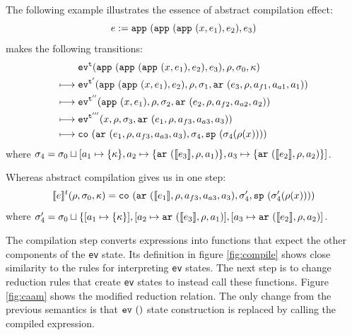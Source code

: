 \documentclass[preprint,onecolumn,9pt]{sigplanconf} %
\begin{document}
The following example illustrates
the essence of abstract compilation effect:
\[
\mexp := \sapp{\sapp{\sapp\mvar{\mexp_1}}{\mexp_2}}{\mexp_3}
\]
makes the following transitions:
\begin{align}
& \ev[^\mcntr]{\sapp{\sapp{\sapp\mvar{\mexp_1}}{\mexp_2}}{\mexp_3},\menv,\msto_0,\mkont}\\
\machstep\; &
\ev[^{\mcntr'}]{\sapp{\sapp\mvar{\mexp_1}}{\mexp_2},\menv,\msto_1,\kar{\mexp_3,\menv,\maddr_{f1},\maddr_{a1},\maddr_1}}
\\
\machstep\; &
\ev[^{\mcntr''}]{\sapp\mvar{\mexp_1},\menv,\msto_2,\kar{\mexp_2,\menv,\maddr_{f2},\maddr_{a2},\maddr_2}}
\\
\machstep\; &
\ev[^{\mcntr'''}]{\mvar, \menv,\msto_3,\kar{\mexp_1,\menv,\maddr_{f3},\maddr_{a3},\maddr_3}} %
\\
\machstep\; &
\spchoice
{\co{\kar{\mexp_1,\menv,\maddr_{f3},\maddr_{a3},\maddr_3},\msto_4,\saddr{\menv(\mvar)}}}
{\co{\kar{\mexp_1,\menv,\maddr_{f3},\maddr_{a3},\maddr_3},\msto_4,\superposition{\msto_4(\menv(\mvar))}}}
\end{align}
where \(
\msto_4 = \msto_0 \sqcup [\maddr_1 \mapsto \setof{\mkont},
\maddr_2 \mapsto \setof{\kar{\compile{\mexp_3},\menv,\maddr_1}},
\maddr_3 \mapsto \setof{\kar{\compile{\mexp_2},\menv,\maddr_2}}]\).

Whereas abstract compilation gives us in one step:
\begin{align*}
\compile{\mexp}^\mcntr(\menv,\msto_0,\mkont) = 
\spchoice
{\co{\kar{\compile{\mexp_1},\menv,\maddr_{f3},\maddr_{a3},\maddr_3},\msto'_4,\saddr{\menv(\mvar)}}}
{\co{\kar{\compile{\mexp_1},\menv,\maddr_{f3},\maddr_{a3},\maddr_3},\msto'_4,\superposition{\msto'_4(\menv(\mvar))}}}
\end{align*}
where \(
\msto'_4 = \msto_0 \sqcup \{ [\maddr_1 \mapsto \{ \mkont \}],
[\maddr_2 \mapsto \kar{\compile{\mexp_3},\menv,\maddr_1}],
[\maddr_3 \mapsto \kar{\compile{\mexp_2},\menv,\maddr_2}]\).

The compilation step converts expressions into functions that expect
the other components of the {\tt ev} state. Its definition in figure
\ref{fig:compile} shows close similarity to the rules for interpreting
{\tt ev} states. The next step is to change reduction rules that
create {\tt ev} states to instead call these functions. Figure
\ref{fig:caam} shows the modified reduction relation. The only change
from the previous semantics is that $\ev{}$ state construction is
replaced by calling the compiled expression.
\end{document}
